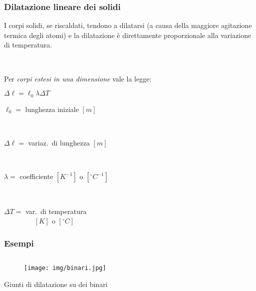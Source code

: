 \documentclass[]{beamer}
\theoremstyle{plain}
\begin{document}
\begin{frame}
\frametitle{Dilatazione lineare dei solidi}
I corpi solidi, se riscaldati, tendono a dilatarsi (a causa della maggiore agitazione termica degli atomi) e \alert{la dilatazione è direttamente proporzionale alla variazione di temperatura}.\pause

~

Per \emph{corpi estesi in una dimensione} vale la legge:
\begin{center}
\colorbox{marroncino!30}{$ \Delta \ell = \ell_0 \lambda \Delta T  $}
\end{center}
  \begin{multicols}{2}
$ \ell_0 = $ lunghezza iniziale $ [m] $

~

$ \Delta \ell = $ variaz.~di lunghezza $ [m] $

~

$ \lambda = $ coefficiente $ [K^{-1}] $ o $ [^\circ C^{-1}] $

~

$ \Delta T = $ var.~di temperatura \\~~~~~~~~ $ [K] $ o $ [ ^\circ C] $
  \end{multicols}
\end{frame}





\begin{frame}
\frametitle{Esempi}
\begin{columns}
\begin{column}{0.3\textwidth}
\begin{figure}
\texttt{[image: img/binari.jpg]}
\end{figure}
Giunti di dilatazione su dei binari
\end{column}
\begin{column}{0.3\textwidth}
\end{column}
\begin{column}{0.3\textwidth}
\end{column}
\end{columns}
\end{frame}
\end{document}
